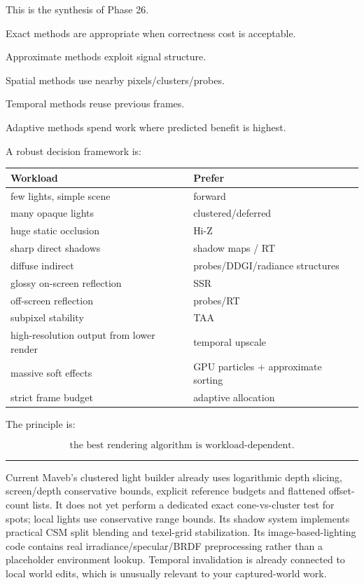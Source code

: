 This is the synthesis of Phase 26.

Exact methods are appropriate when correctness cost is acceptable.

Approximate methods exploit signal structure.

Spatial methods use nearby pixels/clusters/probes.

Temporal methods reuse previous frames.

Adaptive methods spend work where predicted benefit is highest.

A robust decision framework is:

{\def\LTcaptype{none} %
\begin{longtable}[]{@{}ll@{}}
\toprule\noalign{}
Workload & Prefer \\
\midrule\noalign{}
\endhead
\bottomrule\noalign{}
\endlastfoot
few lights, simple scene & forward \\
many opaque lights & clustered/deferred \\
huge static occlusion & Hi-Z \\
sharp direct shadows & shadow maps / RT \\
diffuse indirect & probes/DDGI/radiance structures \\
glossy on-screen reflection & SSR \\
off-screen reflection & probes/RT \\
subpixel stability & TAA \\
high-resolution output from lower render & temporal upscale \\
massive soft effects & GPU particles + approximate sorting \\
strict frame budget & adaptive allocation \\
\end{longtable}
}

The principle is:

\[
\boxed{
\text{the best rendering algorithm is workload-dependent}.
}
\]

\begin{center}\rule{0.5\linewidth}{0.5pt}\end{center}

Current Maveb's clustered light builder already uses logarithmic depth slicing, screen/depth conservative bounds, explicit reference budgets and flattened offset-count lists. It does not yet perform a dedicated exact cone-vs-cluster test for spots; local lights use conservative range bounds. Its shadow system implements practical CSM split blending and texel-grid stabilization. Its image-based-lighting code contains real irradiance/specular/BRDF preprocessing rather than a placeholder environment lookup. Temporal invalidation is already connected to local world edits, which is unusually relevant to your captured-world work.

